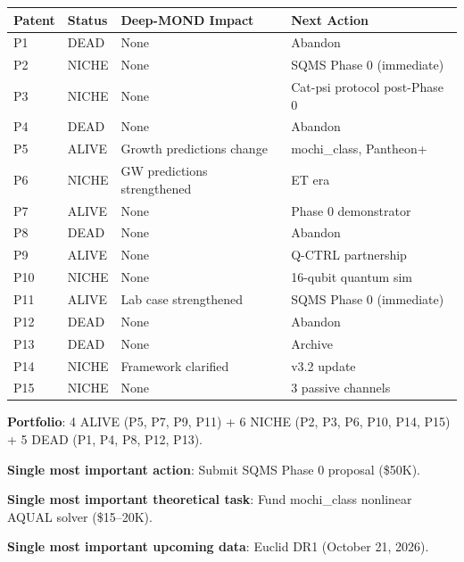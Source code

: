 \documentclass[11pt]{article}
\begin{document}
\begin{center}
\begin{tabular}{llll}
\hline
\textbf{Patent} & \textbf{Status} & \textbf{Deep-MOND Impact} & \textbf{Next Action} \\
\hline
P1  & DEAD   & None    & Abandon \\
P2  & NICHE  & None    & SQMS Phase 0 (immediate) \\
P3  & NICHE  & None    & Cat-psi protocol post-Phase 0 \\
P4  & DEAD   & None    & Abandon \\
P5  & ALIVE  & Growth predictions change & mochi\_class, Pantheon+ \\
P6  & NICHE  & GW predictions strengthened & ET era \\
P7  & ALIVE  & None    & Phase 0 demonstrator \\
P8  & DEAD   & None    & Abandon \\
P9  & ALIVE  & None    & Q-CTRL partnership \\
P10 & NICHE  & None    & 16-qubit quantum sim \\
P11 & ALIVE  & Lab case strengthened & SQMS Phase 0 (immediate) \\
P12 & DEAD   & None    & Abandon \\
P13 & DEAD   & None    & Archive \\
P14 & NICHE  & Framework clarified  & v3.2 update \\
P15 & NICHE  & None    & 3 passive channels \\
\hline
\end{tabular}
\end{center}

\textbf{Portfolio}: 4 ALIVE (P5, P7, P9, P11) + 6 NICHE (P2, P3, P6, P10, P14, P15) + 5 DEAD (P1, P4, P8, P12, P13).

\vspace{1em}

\textbf{Single most important action}: Submit SQMS Phase 0 proposal (\$50K).

\textbf{Single most important theoretical task}: Fund mochi\_class nonlinear AQUAL solver (\$15--20K).

\textbf{Single most important upcoming data}: Euclid DR1 (October 21, 2026).
\end{document}
